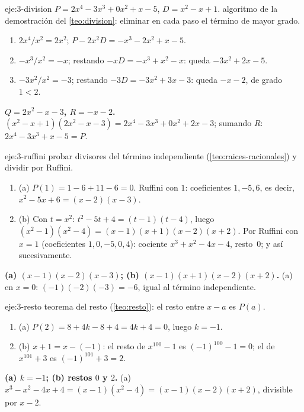 \begin{solucion}{eje:3-division}
\datos $P=2x^4-3x^3+0x^2+x-5$, $D=x^2-x+1$.
\planteamiento algoritmo de la demostración del \cref{teo:division}: eliminar en cada paso el término de mayor grado.
\pasos
\begin{enumerate}[label=\arabic*.]
  \item $2x^4/x^2=2x^2$; $P-2x^2D=-x^3-2x^2+x-5$.
  \item $-x^3/x^2=-x$; restando $-xD=-x^3+x^2-x$: queda $-3x^2+2x-5$.
  \item $-3x^2/x^2=-3$; restando $-3D=-3x^2+3x-3$: queda $-x-2$, de grado $1<2$.
\end{enumerate}
\resultado \textbf{$Q=2x^2-x-3$, $R=-x-2$.}
\comprobacion $(x^2-x+1)(2x^2-x-3)=2x^4-3x^3+0x^2+2x-3$; sumando $R$: $2x^4-3x^3+x-5=P$.
\end{solucion}

\begin{solucion}{eje:3-ruffini}
\planteamiento probar divisores del término independiente (\cref{teo:raices-racionales}) y dividir por Ruffini.
\pasos
\begin{enumerate}[label=\arabic*.]
  \item (a) $P(1)=1-6+11-6=0$. Ruffini con $1$: coeficientes $1,-5,6$, es decir, $x^2-5x+6=(x-2)(x-3)$.
  \item (b) Con $t=x^2$: $t^2-5t+4=(t-1)(t-4)$, luego $(x^2-1)(x^2-4)=(x-1)(x+1)(x-2)(x+2)$. Por Ruffini con $x=1$ (coeficientes $1,0,-5,0,4$): cociente $x^3+x^2-4x-4$, resto~0; y así sucesivamente.
\end{enumerate}
\resultado \textbf{(a) $(x-1)(x-2)(x-3)$; (b) $(x-1)(x+1)(x-2)(x+2)$.}
\comprobacion (a) en $x=0$: $(-1)(-2)(-3)=-6$, igual al término independiente.
\end{solucion}

\begin{solucion}{eje:3-resto}
\planteamiento teorema del resto (\cref{teo:resto}): el resto entre $x-a$ es $P(a)$.
\pasos
\begin{enumerate}[label=\arabic*.]
  \item (a) $P(2)=8+4k-8+4=4k+4=0$, luego $k=-1$.
  \item (b) $x+1=x-(-1)$: el resto de $x^{100}-1$ es $(-1)^{100}-1=0$; el de $x^{101}+3$ es $(-1)^{101}+3=2$.
\end{enumerate}
\resultado \textbf{(a) $k=-1$; (b) restos $0$ y $2$.}
\comprobacion (a) $x^3-x^2-4x+4=(x-1)(x^2-4)=(x-1)(x-2)(x+2)$, divisible por $x-2$.
\end{solucion}

